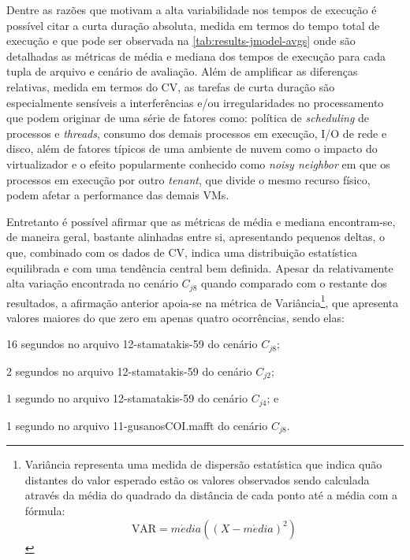 \documentclass[english,brazilian]{UNISINOSmonografia} %
\begin{document}
Dentre as razões que motivam a alta variabilidade nos tempos de execução é possível citar a curta duração absoluta, medida em termos do tempo total de execução e que pode ser observada na \autoref{tab:results-jmodel-avgs} onde são detalhadas as métricas de média e mediana dos tempos de execução para cada tupla de arquivo e cenário de avaliação.
%
Além de amplificar as diferenças relativas, medida em termos do CV, as tarefas de curta duração são especialmente sensíveis a interferências e/ou irregularidades no processamento que podem originar de uma série de fatores como: política de \textit{scheduling} de processos e \textit{threads}, consumo dos demais processos em execução, I/O de rede e disco, além de fatores típicos de uma ambiente de nuvem como o impacto do virtualizador e o efeito popularmente conhecido como \textit{noisy neighbor} em que os processos em execução por outro \textit{tenant}, que divide o mesmo recurso físico, podem afetar a performance das demais VMs.


Entretanto é possível afirmar que as métricas de média e mediana encontram-se, de maneira geral, bastante alinhadas entre si, apresentando pequenos deltas, o que, combinado com os dados de CV, indica uma distribuição estatística equilibrada e com uma tendência central bem definida.
%
Apesar da relativamente alta variação encontrada no cenário $C_{j8}$ quando comparado com o restante dos resultados, a afirmação anterior apoia-se na métrica de Variância\footnote{
	Variância representa uma medida de dispersão estatística que indica quão distantes do valor esperado estão os valores observados sendo calculada através da média do quadrado da distância de cada ponto até a média com a fórmula:
	\[ \text{VAR} = m\acute{e}dia\left((X-m\acute{e}dia)^2\right) \]
}, que apresenta valores maiores do que zero em apenas quatro ocorrências, sendo elas:
\begin{inparaenum} 
	\item 16 segundos no arquivo 12-stamatakis-59 do cenário $C_{j8}$;
	\item 2 segundos no arquivo 12-stamatakis-59 do cenário $C_{j2}$;
	\item 1 segundo no arquivo 12-stamatakis-59 do cenário $C_{j4}$; e
	\item 1 segundo no arquivo 11-gusanosCOI.mafft do cenário $C_{j8}$.
\end{inparaenum}
\end{document}
